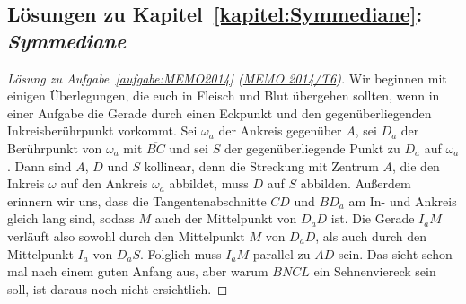 \subsection*{Lösungen zu Kapitel~\ref{kapitel:Symmediane}: \emph{Symmediane}}

\begin{proof}[Lösung zu Aufgabe~\ref{aufgabe:MEMO2014} \textmd{(\href{https://artofproblemsolving.com/community/c3587_2014_middle_european_mathematical_olympiad}{MEMO 2014/T6})}]
	Wir beginnen mit einigen Überlegungen, die euch in Fleisch und Blut übergehen sollten, wenn in einer Aufgabe die Gerade durch einen Eckpunkt und den gegenüberliegenden Inkreisberührpunkt vorkommt. Sei $\omega_a$ der Ankreis gegenüber $A$, sei $D_a$ der Berührpunkt von $\omega_a$ mit $\overline{BC}$ und sei $S$ der gegenüberliegende Punkt zu $D_a$ auf $\omega_a$. Dann sind $A$, $D$ und $S$ kollinear, denn die Streckung mit Zentrum $A$, die den Inkreis $\omega$ auf den Ankreis $\omega_a$ abbildet, muss $D$ auf $S$ abbilden. Außerdem erinnern wir uns, dass die Tangentenabschnitte $\overline{CD}$ und $\overline{BD_a}$ am In- und Ankreis gleich lang sind, sodass $M$ auch der Mittelpunkt von $\overline{D_aD}$ ist. Die Gerade $I_aM$ verläuft also sowohl durch den Mittelpunkt $M$ von $\overline{D_aD}$, als auch durch den Mittelpunkt $I_a$ von $\overline{D_aS}$. Folglich muss $I_aM$ parallel zu $AD$ sein. Das sieht schon mal nach einem guten Anfang aus, aber warum $BNCL$ ein Sehnenviereck sein soll, ist daraus noch nicht ersichtlich.
	

\end{proof}
